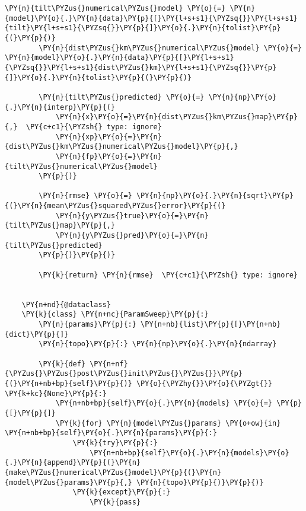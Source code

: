 \begin{tcolorbox}[breakable, size=fbox, boxrule=1pt, pad at break*=1mm,colback=cellbackground, colframe=cellborder]
\begin{Verbatim}[commandchars=\\\{\}]
        \PY{n}{tilt\PYZus{}numerical\PYZus{}model} \PY{o}{=} \PY{n}{model}\PY{o}{.}\PY{n}{data}\PY{p}{[}\PY{l+s+s1}{\PYZsq{}}\PY{l+s+s1}{tilt}\PY{l+s+s1}{\PYZsq{}}\PY{p}{]}\PY{o}{.}\PY{n}{tolist}\PY{p}{(}\PY{p}{)}
        \PY{n}{dist\PYZus{}km\PYZus{}numerical\PYZus{}model} \PY{o}{=} \PY{n}{model}\PY{o}{.}\PY{n}{data}\PY{p}{[}\PY{l+s+s1}{\PYZsq{}}\PY{l+s+s1}{dist\PYZus{}km}\PY{l+s+s1}{\PYZsq{}}\PY{p}{]}\PY{o}{.}\PY{n}{tolist}\PY{p}{(}\PY{p}{)}
    
        \PY{n}{tilt\PYZus{}predicted} \PY{o}{=} \PY{n}{np}\PY{o}{.}\PY{n}{interp}\PY{p}{(}
            \PY{n}{x}\PY{o}{=}\PY{n}{dist\PYZus{}km\PYZus{}map}\PY{p}{,}  \PY{c+c1}{\PYZsh{} type: ignore}
            \PY{n}{xp}\PY{o}{=}\PY{n}{dist\PYZus{}km\PYZus{}numerical\PYZus{}model}\PY{p}{,}
            \PY{n}{fp}\PY{o}{=}\PY{n}{tilt\PYZus{}numerical\PYZus{}model}
        \PY{p}{)}
    
        \PY{n}{rmse} \PY{o}{=} \PY{n}{np}\PY{o}{.}\PY{n}{sqrt}\PY{p}{(}\PY{n}{mean\PYZus{}squared\PYZus{}error}\PY{p}{(}
            \PY{n}{y\PYZus{}true}\PY{o}{=}\PY{n}{tilt\PYZus{}map}\PY{p}{,}
            \PY{n}{y\PYZus{}pred}\PY{o}{=}\PY{n}{tilt\PYZus{}predicted}
        \PY{p}{)}\PY{p}{)}
    
        \PY{k}{return} \PY{n}{rmse}  \PY{c+c1}{\PYZsh{} type: ignore}
    
    
    \PY{n+nd}{@dataclass}
    \PY{k}{class} \PY{n+nc}{ParamSweep}\PY{p}{:}
        \PY{n}{params}\PY{p}{:} \PY{n+nb}{list}\PY{p}{[}\PY{n+nb}{dict}\PY{p}{]}
        \PY{n}{topo}\PY{p}{:} \PY{n}{np}\PY{o}{.}\PY{n}{ndarray}
    
        \PY{k}{def} \PY{n+nf}{\PYZus{}\PYZus{}post\PYZus{}init\PYZus{}\PYZus{}}\PY{p}{(}\PY{n+nb+bp}{self}\PY{p}{)} \PY{o}{\PYZhy{}}\PY{o}{\PYZgt{}} \PY{k+kc}{None}\PY{p}{:}
            \PY{n+nb+bp}{self}\PY{o}{.}\PY{n}{models} \PY{o}{=} \PY{p}{[}\PY{p}{]}
            \PY{k}{for} \PY{n}{model\PYZus{}params} \PY{o+ow}{in} \PY{n+nb+bp}{self}\PY{o}{.}\PY{n}{params}\PY{p}{:}
                \PY{k}{try}\PY{p}{:}
                    \PY{n+nb+bp}{self}\PY{o}{.}\PY{n}{models}\PY{o}{.}\PY{n}{append}\PY{p}{(}\PY{n}{make\PYZus{}numerical\PYZus{}model}\PY{p}{(}\PY{n}{model\PYZus{}params}\PY{p}{,} \PY{n}{topo}\PY{p}{)}\PY{p}{)}
                \PY{k}{except}\PY{p}{:}
                    \PY{k}{pass}
    

\end{Verbatim}
\end{tcolorbox}
